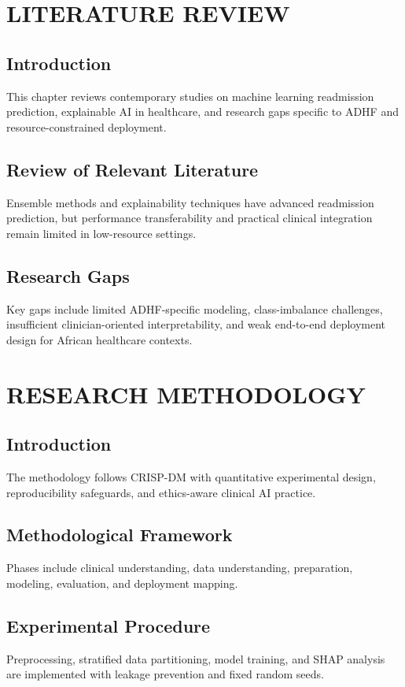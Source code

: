 \documentclass[12pt,a4paper]{report}
\begin{document}
\chapter{LITERATURE REVIEW}
\section{Introduction}
This chapter reviews contemporary studies on machine learning readmission prediction, explainable AI in healthcare, and research gaps specific to ADHF and resource-constrained deployment.

\section{Review of Relevant Literature}
Ensemble methods and explainability techniques have advanced readmission prediction, but performance transferability and practical clinical integration remain limited in low-resource settings.

\section{Research Gaps}
Key gaps include limited ADHF-specific modeling, class-imbalance challenges, insufficient clinician-oriented interpretability, and weak end-to-end deployment design for African healthcare contexts.

\chapter{RESEARCH METHODOLOGY}
\section{Introduction}
The methodology follows CRISP-DM with quantitative experimental design, reproducibility safeguards, and ethics-aware clinical AI practice.

\section{Methodological Framework}
Phases include clinical understanding, data understanding, preparation, modeling, evaluation, and deployment mapping.

\section{Experimental Procedure}
Preprocessing, stratified data partitioning, model training, and SHAP analysis are implemented with leakage prevention and fixed random seeds.
\end{document}
